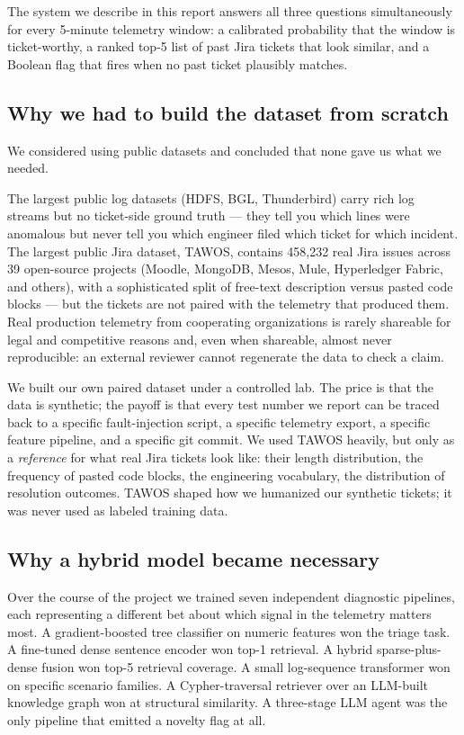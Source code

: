 The system we describe in this report answers all three questions simultaneously for every 5-minute telemetry window: a calibrated probability that the window is ticket-worthy, a ranked top-5 list of past Jira tickets that look similar, and a Boolean flag that fires when no past ticket plausibly matches.

\subsection{Why we had to build the dataset from scratch}

We considered using public datasets and concluded that none gave us what we needed.

The largest public log datasets (HDFS, BGL, Thunderbird) carry rich log streams but no ticket-side ground truth --- they tell you which lines were anomalous but never tell you which engineer filed which ticket for which incident. The largest public Jira dataset, TAWOS, contains 458{,}232 real Jira issues across 39 open-source projects (Moodle, MongoDB, Mesos, Mule, Hyperledger Fabric, and others), with a sophisticated split of free-text description versus pasted code blocks --- but the tickets are not paired with the telemetry that produced them. Real production telemetry from cooperating organizations is rarely shareable for legal and competitive reasons and, even when shareable, almost never reproducible: an external reviewer cannot regenerate the data to check a claim.

We built our own paired dataset under a controlled lab. The price is that the data is synthetic; the payoff is that every test number we report can be traced back to a specific fault-injection script, a specific telemetry export, a specific feature pipeline, and a specific git commit. We used TAWOS heavily, but only as a \emph{reference} for what real Jira tickets look like: their length distribution, the frequency of pasted code blocks, the engineering vocabulary, the distribution of resolution outcomes. TAWOS shaped how we humanized our synthetic tickets; it was never used as labeled training data.

\subsection{Why a hybrid model became necessary}

Over the course of the project we trained seven independent diagnostic pipelines, each representing a different bet about which signal in the telemetry matters most. A gradient-boosted tree classifier on numeric features won the triage task. A fine-tuned dense sentence encoder won top-1 retrieval. A hybrid sparse-plus-dense fusion won top-5 retrieval coverage. A small log-sequence transformer won on specific scenario families. A Cypher-traversal retriever over an LLM-built knowledge graph won at structural similarity. A three-stage LLM agent was the only pipeline that emitted a novelty flag at all.

